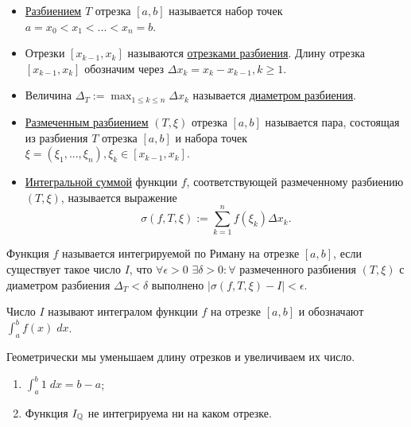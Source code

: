 	\begin{definition}
		\begin{itemize}
			
			\item \underline{Разбиением} $T$ отрезка $[a, b]$ называется набор точек
			$a = x_0 < x_1 < ... < x_n = b$.
			
			\item Отрезки $[x_{k - 1}, x_k]$ называются \underline{отрезками разбиения}. Длину отрезка $[x_{k - 1}, x_k]$ обозначим через $\Delta x_k = x_k - x_{k - 1}, k \geqslant 1$.
			
			\item Величина $\Delta_T := \displaystyle \max_{1 \leqslant k \leqslant n} \Delta x_k$ называется \underline{диаметром разбиения}.
			
			\item \underline{Размеченным разбиением} $(T, \xi)$ отрезка $[a, b]$ называется пара, состоящая из разбиения $T$ отрезка $[a, b]$ и набора точек $\xi = (\xi_1, ..., \xi_n), \xi_k \in [x_{k - 1}, x_k]$.
			
			\item \underline{Интегральной суммой} функции $f$, соответствующей размеченному разбиению $(T, \xi)$, называется выражение
			\[ \sigma(f, T, \xi) := \sum^{n}_{k = 1} f(\xi_k) \Delta x_k. \]
		\end{itemize}
	\end{definition}
	
	\begin{definition}
		Функция $f$ называется интегрируемой по Риману на отрезке
		$[a, b]$, если существует такое число $I$, что $\forall \epsilon > 0$ $\exists \delta > 0: \forall$ размеченного разбиения $(T, \xi)$ с диаметром разбиения $\Delta_T < \delta$ выполнено $|\sigma(f, T, \xi) - I| < \epsilon$.
		
		Число $I$ называют интегралом функции $f$ на отрезке $[a, b]$ и
		обозначают $\displaystyle\int^{b}_{a} f(x) \; dx$.
	\end{definition}
	
	\begin{explanation}
		Геометрически мы уменьшаем длину отрезков и увеличиваем их число.
	\end{explanation}
	
	\begin{example}
		\begin{enumerate}
			\item $\displaystyle\int^{b}_{a} 1 \; dx = b - a$;
			\item Функция $I_{\mathbb Q}$ не интегрируема ни на каком отрезке.
		\end{enumerate}	
	\end{example}
	
